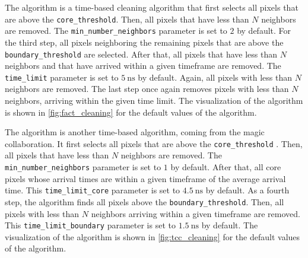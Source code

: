 The \fact{} algorithm is a time-based cleaning algorithm that first selects all pixels that are above
the \texttt{core\_threshold}. Then, all pixels that have less than \(N\) neighbors are removed. The
\texttt{min\_number\_neighbors} parameter is set to \(\num{2}\) by default. For the third step, all pixels neighboring
the remaining pixels that are above the \texttt{boundary\_threshold} are selected. After that, all
pixels that have less than \(N\) neighbors and that have arrived within a given timeframe are removed.
The \texttt{time\_limit} parameter is set to \(\SI{5}{\nano\second}\) by default. Again, all pixels
with less than \(N\) neighbors are removed. The last step once again removes pixels with less than
\(N\) neighbors, arriving within the given time limit. The visualization of the algorithm is shown in
\autoref{fig:fact_cleaning} for the default values of the algorithm.

The \tcc{} algorithm is another time-based algorithm, coming from the \gls{magic} collaboration.
It first selects all pixels that are above the \texttt{core\_threshold} \cite{tcc}. Then, all pixels that have
less than \(N\) neighbors are removed. The \texttt{min\_number\_neighbors} parameter is set to \(\num{1}\) by default.
After that, all core pixels whose arrival times are within a given timeframe of the average arrival time.
This \texttt{time\_limit\_core} parameter is set to \(\SI{4.5}{\nano\second}\) by default. As a fourth step,
the \tcc{} algorithm finds all pixels above the \texttt{boundary\_threshold}. Then, all pixels with
less than \(N\) neighbors arriving within a given timeframe are removed. This \texttt{time\_limit\_boundary}
parameter is set to \(\SI{1.5}{\nano\second}\) by default. The visualization of the algorithm is shown in
\autoref{fig:tcc_cleaning} for the default values of the algorithm.


